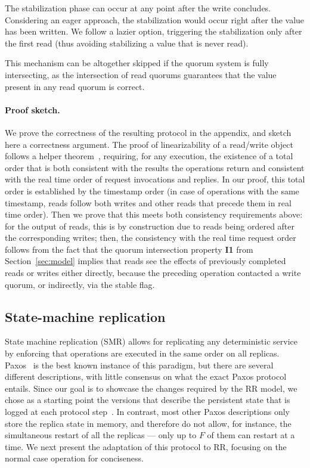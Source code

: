 The stabilization phase can
occur at any point after the write concludes. Considering an eager
approach, the stabilization would occur right after the value has been
written. We follow a lazier option, triggering the stabilization only
after the first read (thus avoiding stabilizing a value that is never
read).

This mechanism can be altogether skipped if the quorum
system is fully intersecting, as the intersection of read quorums
guarantees that the value present in any read quorum is correct.

\paragraph{Proof sketch.}
We prove the correctness of the resulting protocol in the
appendix, and sketch here a correctness argument. The proof of
linearizability of a read/write object follows a helper
theorem~\cite{nancy-book}, requiring, for any execution, the
existence of a total order that is both consistent with the
results the operations return and consistent with the real time
order of request invocations and replies. In our proof, this
total order is established by the timestamp order (in case of
operations with the same timestamp, reads follow both writes and
other reads that precede them in real time order).  Then we prove
that this meets both consistency requirements above: for the
output of reads, this is by construction due to reads being
ordered after the corresponding writes; then,
the consistency with the real time request order follows from the
fact that the quorum intersection property \textbf{I1} from
Section~\ref{sec:model} implies that reads see the effects of
previously completed reads or writes either directly, because the
preceding operation contacted a write quorum, or indirectly, via
the stable flag.


\subsection{State-machine replication}\label{ssec:paxos}

State machine replication (SMR) allows for replicating any
deterministic service by enforcing that operations are executed in the
same order on all replicas. Paxos~\cite{paxos} is the best known
instance of this paradigm, but there are several different
descriptions, with little consensus on what the exact Paxos protocol
entails.  Since our goal is to showcase the changes required by the
\ac{RR} model, we chose as a starting point the versions that
describe the persistent state that is logged at each protocol
step~\cite{paxos_builders,paxos_engineering}. In contrast, most other
Paxos descriptions only store the replica state in memory, and therefore
do not allow, for instance, the simultaneous restart of all the
replicas --- only up to $F$ of them can restart at a time. We next
present the adaptation of this protocol to \ac{RR}, focusing on
the normal case operation for conciseness.

